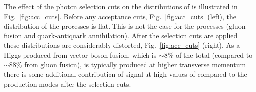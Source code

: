 The effect of the photon selection cuts on the distributions of 
\abscostheta is illustrated in Fig.~\ref{fig:acc_cuts}. Before any acceptance cuts, Fig.~\ref{fig:acc_cuts} (left), the \abscostheta
distribution of the \zerop processes is flat. This is not the case for the \twomp processes (gluon-fusion and quark-antiquark annihilation). After the selection cuts are applied these distributions are considerably distorted, Fig.~\ref{fig:acc_cuts} (right). As a Higgs produced from vector-boson-fusion, which is $\sim$8\% of the total (compared to $\sim$88\% from gluon fusion),  is typically produced at higher transverse momentum there is some additional contribution of \zerop signal at high values of \abscostheta compared to the \twomp production modes after the selection cuts.

